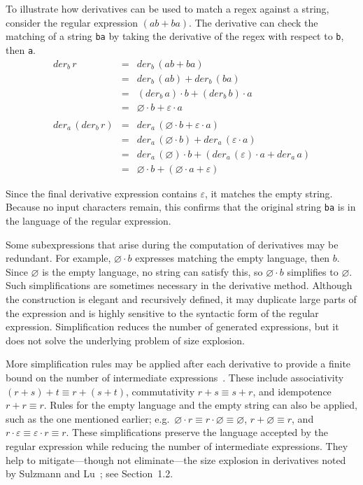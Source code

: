 \documentclass[12pt]{article}
\newcommand{\der}{\textit{der}}
\begin{document}
To illustrate how derivatives can be used to match a regex against a string, consider the regular expression $( ab + ba )$. 
The derivative can check the matching of a string \texttt{ba} by taking the derivative of the regex with respect to \texttt{b},
then \texttt{a}.
\[
\begin{array}{rcl}
\der_b\, r           & =           &  \der_b\, (ab + ba) \\
                     & =           & \der_b\, (ab) + \der_b\, (ba) \\
                     & =           & (\der_b\, a) \cdot b + (\der_b\, b) \cdot a  \\
                     & =           & \varnothing \cdot b + \varepsilon \cdot a \\\\

\der_a\, (\der_b\, r) & =           & \der_a\, (\varnothing \cdot b + \varepsilon \cdot a)\\
                      & =           & \der_a\, (\varnothing \cdot b) + \der_a\, (\varepsilon \cdot a)\\
                      & =           & \der_a\,(\varnothing) \cdot b + (\der_a\, (\varepsilon) \cdot a + \der_a\, a)\\
                      & =           & \varnothing \cdot b + (\varnothing \cdot a + \varepsilon )
\end{array}
\]


Since the final derivative expression contains $\varepsilon$, it matches the empty string. Because no input characters 
remain, this confirms that the original string \texttt{ba} is in the language of the regular expression.


Some subexpressions that arise during the computation of derivatives may be redundant.  
For example, $\varnothing \cdot b$ expresses matching the empty language, then $b$.  
Since $\varnothing$ is the empty language, no string can satisfy this, so $\varnothing \cdot b$ simplifies to $\varnothing$.  
Such simplifications are sometimes necessary in the derivative method.  
Although the construction is elegant and recursively defined, it may duplicate large parts of the expression and is highly 
sensitive to the syntactic form of the regular expression. Simplification reduces the number of generated expressions, but 
it does not solve the underlying problem of size explosion.

More simplification rules may be applied after each derivative to provide a finite bound on the number of intermediate 
expressions~\cite{TanAndUrban2023}. These include associativity $(r+s)+t \equiv r+(s+t)$, commutativity $r+s \equiv s+r$, 
and idempotence $r+r \equiv r$. Rules for the empty language and the empty string can also be applied, such as the one 
mentioned earlier; e.g.\ $\varnothing \cdot r \equiv r \cdot \varnothing \equiv \varnothing$, $r+\varnothing \equiv r$, 
and $r \cdot \varepsilon \equiv \varepsilon \cdot r \equiv r$. 
These simplifications preserve the language accepted by the regular expression while reducing the number of intermediate expressions. 
They help to mitigate—though not eliminate—the size explosion in derivatives noted by Sulzmann and Lu~\cite{Sulzmann2014}; see Section~1.2.
\end{document}
